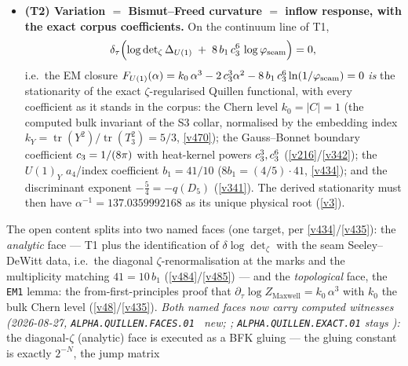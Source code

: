 \begin{itemize}
  \emph{Dai--Freed data.} A Dai--Freed vector requires an actual family of fillings
  and takes values in the pulled-back inverse boundary line. A global nonvanishing
  section may be asserted only on that pullback or on a specified anomaly-cancelled
  product, not on the uncompensated line with nonzero $c_1$. Alternatively, cylinders and
  mapping tori may define transport and holonomy without a global trivialisation.
  All continuum comparison statements remain \mO; the finite Berry/gap results
  of \vref{v472} are unchanged.
\item \textbf{(T2) Variation $=$ Bismut--Freed curvature $=$ inflow response, with the exact
  corpus coefficients.} On the continuum line of T1,
  \[
    \delta_\tau\Bigl(\log\det\nolimits_\zeta\Delta_{U(1)}\;+\;8\,b_1\,c_3^{6}\,
    \log\varphi_{\mathrm{seam}}\Bigr)=0 ,
  \]
  i.e.\ the EM closure $F_{U(1)}(\alpha)=k_0\,\alpha^3-2\,c_3^{3}\alpha^2-8\,b_1\,c_3^{6}
  \ln(1/\varphi_{\mathrm{seam}})=0$ \emph{is} the stationarity of the exact
  $\zeta$-regularised Quillen functional, with every coefficient as it stands in the corpus:
  the Chern level $k_0=|C|=1$ (the computed bulk invariant of the S3 collar, normalised by the
  embedding index $k_Y=\operatorname{tr}(Y^2)/\operatorname{tr}(T_3^2)=5/3$, \vref{v470}); the
  Gauss--Bonnet boundary coefficient $c_3=1/(8\pi)$ with heat-kernel powers
  $c_3^{3},c_3^{6}$ (\vref{v216}/\vref{v342}); the $U(1)_Y$ $a_4$/index coefficient
  $b_1=41/10$ ($8b_1=(4/5)\cdot41$, \vref{v434}); and the discriminant exponent
  $-\tfrac54=-q(D_5)$ (\vref{v341}). The derived stationarity must then have
  $\alpha^{-1}=137.0359992168$ as its unique physical root (\vref{v3}).
\end{itemize}
The open content splits into two named faces (one target, per \vref{v434}/\vref{v435}): the
\emph{analytic} face --- T1 plus the identification of $\delta\log\det_\zeta$ with the seam
Seeley--DeWitt data, i.e.\ the diagonal $\zeta$-renormalisation at the marks and the
multiplicity matching $41=10\,b_1$ (\vref{v484}/\vref{v485}) --- and the \emph{topological}
face, the \texttt{EM1} lemma: the from-first-principles proof that
$\partial_\tau\log Z_{\mathrm{Maxwell}}=k_0\,\alpha^3$ with $k_0$ the bulk Chern level
(\vref{v48}/\vref{v435}).
\emph{Both named faces now carry computed witnesses (2026-08-27,
\texttt{ALPHA.QUILLEN.FACES.01} \mE\ new; ;
\texttt{ALPHA.QUILLEN.EXACT.01} stays \mO):} the diagonal-$\zeta$ (analytic) face is executed
as a BFK gluing --- the gluing constant is exactly $2^{-N}$, the jump matrix

